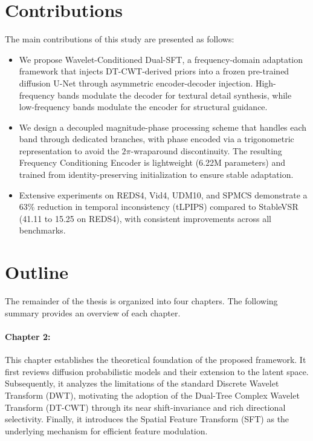 \section{Contributions}
The main contributions of this study are presented as follows:
\begin{itemize}
    \item We propose Wavelet-Conditioned Dual-SFT, a frequency-domain adaptation framework that injects 
    DT-CWT-derived priors into a frozen pre-trained diffusion U-Net through asymmetric encoder-decoder injection. High-frequency bands modulate the decoder for textural detail synthesis, while low-frequency bands modulate the encoder for structural guidance.
    
    \item We design a decoupled magnitude-phase processing scheme that handles each band through dedicated branches, with phase encoded via a trigonometric representation to avoid the $2\pi$-wraparound discontinuity. The resulting Frequency Conditioning Encoder is lightweight (6.22M parameters) and trained from identity-preserving initialization to ensure stable adaptation.
    
    \item Extensive experiments on REDS4, Vid4, UDM10, and SPMCS demonstrate a 63\% reduction in temporal 
    inconsistency (tLPIPS) compared to StableVSR (41.11 to 15.25 on REDS4), with consistent improvements across all benchmarks.
\end{itemize}


\section{Outline}
The remainder of the thesis is organized into four chapters. 
The following summary provides an overview of each chapter.

\paragraph*{Chapter 2:} This chapter establishes the theoretical foundation of the proposed framework. It first reviews diffusion probabilistic models and their extension to the latent space. Subsequently, it analyzes the limitations of the standard Discrete Wavelet Transform (DWT), motivating the adoption of the Dual-Tree Complex Wavelet Transform (DT-CWT) through its near shift-invariance and rich directional selectivity. Finally, it introduces the Spatial Feature 
Transform (SFT) as the underlying mechanism for efficient feature modulation.

